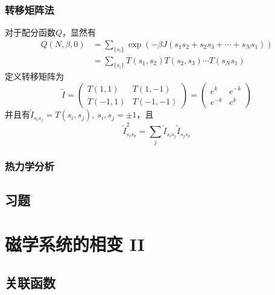 \documentclass[AutoFakeBold]{tstextbook}
\begin{document}
\subsection{转移矩阵法} %
\label{sub:转移矩阵法}
对于配分函数$Q$，显然有\begin{equation}
\begin{aligned}
    Q(N,\beta,0)&=\sum_{\{s_i\}} \exp({-\beta J (s_1s_2+s_2s_3+\cdots +s_Ns_1)})\\
    &=\sum_{\{s_i\}} T(s_1,s_2)T(s_2,s_3)\cdots T(s_Ns_1)    
\end{aligned}
\end{equation}
定义转移矩阵为 \begin{equation}
    \widetilde{I} =\begin{pmatrix}
        T(1,1)& T(1,-1)\\
        T(-1,1) & T(-1,-1)
    \end{pmatrix}=\begin{pmatrix}
        e^{k} & e^{-k}\\
        e^{-k} & e^{k}
    \end{pmatrix}
\end{equation}
并且有$\widetilde{I}_{s_is_j}=T(s_i,s_j),\ s_{i},s_j=\pm 1$，且\begin{equation}
    \widetilde{I}_{s_is_k}^2 =\sum_j \widetilde{I}_{s_is_j}\widetilde{I}_{s_js_k}
\end{equation}
\subsection{热力学分析} %
\label{sub:热力学分析}

\section{习题} %
\label{sec:习题10}

\chapter{磁学系统的相变 II} %
\label{cha:磁学系统的相变 II}
\section{关联函数} %
\label{sec:关联函数}

\end{document}

